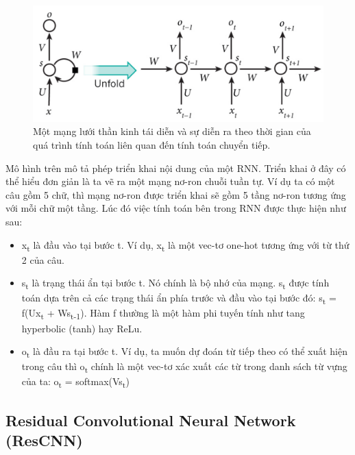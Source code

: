 \documentclass[conference]{IEEEtran}
\begin{document}
\begin{figure}[H]
    \centering
    \begin{minipage}{0.43\textwidth}
        \centering
        \includegraphics[width=1\textwidth]{bibliography/figure/RNN/RNN.pdf}
        \caption{Một mạng lưới thần kinh tái diễn và sự diễn ra theo thời gian của quá trình tính toán liên quan đến tính toán chuyển tiếp.}
        \label{fig:RNN}
    \end{minipage}

\end{figure}

Mô hình trên mô tả phép triển khai nội dung của một RNN. Triển khai ở đây có thể hiểu đơn giản là ta vẽ ra một mạng nơ-ron chuỗi tuần tự. Ví dụ ta có một câu gồm 5 chữ, thì mạng nơ-ron được triển khai sẽ gồm 5 tầng nơ-ron tương ứng với mỗi chữ một tầng. Lúc đó việc tính toán bên trong RNN được thực hiện như sau:
\begin{itemize}
    \item x\textsubscript{t} là đầu vào tại bước t. Ví dụ, x\textsubscript{t} là một vec-tơ one-hot tương ứng với từ thứ 2 của câu.
    \item s\textsubscript{t} là trạng thái ẩn tại bước t. Nó chính là bộ nhớ của mạng. s\textsubscript{t} được tính toán dựa trên cả các trạng thái ẩn phía trước và đầu vào tại bước đó: s\textsubscript{t} = f(Ux\textsubscript{t} +  Ws\textsubscript{t-1}). Hàm f thường là một hàm phi tuyến tính như tang hyperbolic (tanh) hay ReLu.
    \item o\textsubscript{t} là đầu ra tại bước t. Ví dụ, ta muốn dự đoán từ tiếp theo có thể xuất hiện trong câu thì o\textsubscript{t} chính là một vec-tơ xác xuất các từ trong danh sách từ vựng của ta: o\textsubscript{t} = softmax(Vs\textsubscript{t})
\end{itemize}


\subsection{Residual Convolutional Neural Network (ResCNN)}
\end{document}
